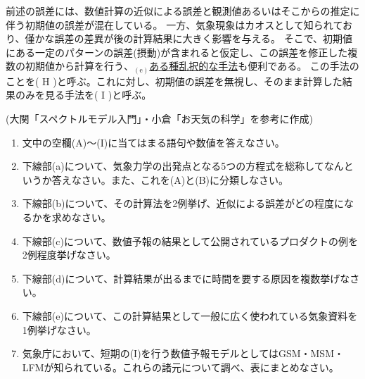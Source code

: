 \documentclass{jsarticle}
\newenvironment{problems}
{
  \renewcommand\labelenumi{\doublebox{\arabic{enumi}}}
  \begin{enumerate}
}{
  \end{enumerate}
  \renewcommand\labelenumi{\arabic{enumi}.}
}
\begin{document}
\begin{problems}
\begin{screen}
        前述の誤差には、数値計算の近似による誤差と観測値あるいはそこからの推定に伴う初期値の誤差が混在している。
        一方、気象現象はカオスとして知られており、僅かな誤差の差異が後の計算結果に大きく影響を与える。
        そこで、初期値にある一定のパターンの誤差(摂動)が含まれると仮定し、この誤差を修正した複数の初期値から計算を行う、$_{(\mathrm{e})}$\underline{ある種乱択的な手法}も便利である。
        この手法のことを( H )と呼ぶ。これに対し、初期値の誤差を無視し、そのまま計算した結果のみを見る手法を( I )と呼ぶ。
            \begin{flushright}
            (大関「スペクトルモデル入門」・小倉「お天気の科学」を参考に作成)
            \end{flushright}
        \end{screen}

        \begin{enumerate}[(1)]
        \item 文中の空欄(A)〜(I)に当てはまる語句や数値を答えなさい。
        \item 下線部(a)について、気象力学の出発点となる5つの方程式を総称してなんというか答えなさい。また、これを(A)と(B)に分類しなさい。
        \item 下線部(b)について、その計算法を2例挙げ、近似による誤差がどの程度になるかを求めなさい。
        \item 下線部(c)について、数値予報の結果として公開されているプロダクトの例を2例程度挙げなさい。
        \item 下線部(d)について、計算結果が出るまでに時間を要する原因を複数挙げなさい。
        \item 下線部(e)について、この計算結果として一般に広く使われている気象資料を1例挙げなさい。
        \item 気象庁において、短期の(I)を行う数値予報モデルとしてはGSM・MSM・LFMが知られている。これらの諸元について調べ、表にまとめなさい。\\
        \end{enumerate}


\end{problems}
\end{document}
